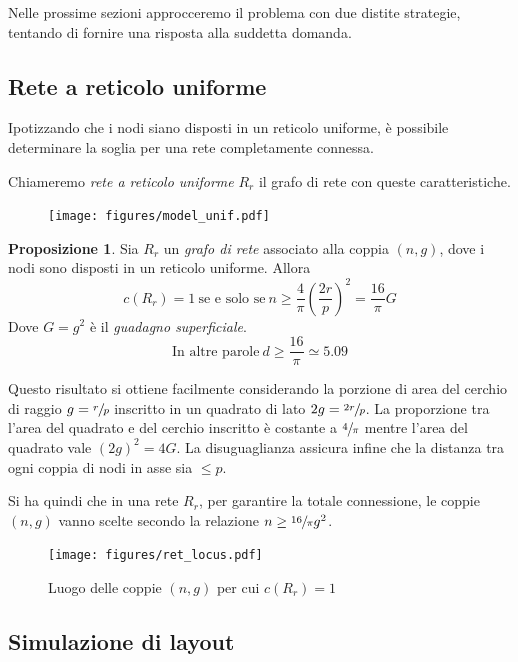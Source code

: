 \documentclass[a4paper,12pt]{article}
\theoremstyle{definition}
\newtheorem{proposition}{Proposizione}
\begin{document}
Nelle prossime sezioni approcceremo il problema con due distite strategie, tentando di fornire una risposta alla suddetta domanda.

\subsection{Rete a reticolo uniforme}

Ipotizzando che i nodi siano disposti in un reticolo uniforme, è possibile determinare la soglia per una rete completamente connessa.

Chiameremo \emph{rete a reticolo uniforme} $R_r$ il grafo di rete con queste caratteristiche.

\begin{figure}[H]
\centering
\texttt{[image: figures/model\_unif.pdf]}
\caption{}
\end{figure}

\begin{proposition}
Sia $R_r$ un \emph{grafo di rete} associato alla coppia $(n, g)$, dove i nodi sono disposti in un reticolo uniforme. Allora
\begin{equation*}
c(R_r) = 1 \ \text{se e solo se} \ n \geq \frac{4}{\pi} \left(\frac{2r}{p}\right)^2 = \frac{16}{\pi} G
\end{equation*}
Dove $G = g^2$ è il \emph{guadagno superficiale}.
\begin{equation*}
\text{In altre parole} \ d \geq \frac{16}{\pi} \simeq 5.09
\end{equation*}
\end{proposition}

Questo risultato si ottiene facilmente considerando la porzione di area del cerchio di raggio $g = \sfrac{r}{p}$ inscritto in un quadrato di lato $2g = \sfrac{2r}{p}$. La proporzione tra l'area del quadrato e del cerchio inscritto è costante a $\sfrac{4}{\pi}$ mentre l'area del quadrato vale $(2g)^2 = 4G$. La disuguaglianza assicura infine che la distanza tra ogni coppia di nodi in asse sia $\leq p$.

Si ha quindi che in una rete $R_r$, per garantire la totale connessione, le coppie $(n, g)$ vanno scelte secondo la relazione $n \geq \sfrac{16}{\pi} g^2$.

\begin{figure}[H]
\centering
\texttt{[image: figures/ret\_locus.pdf]}
\caption{Luogo delle coppie $(n, g)$ per cui $c(R_r) = 1$}
\end{figure}

\subsection{Simulazione di layout}
\end{document}
